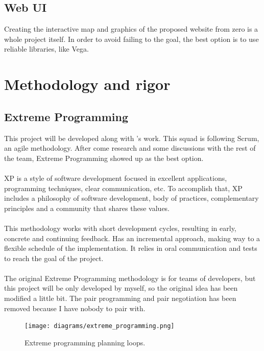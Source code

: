 \subsection{Web UI}

Creating the interactive map and graphics of the proposed website from zero is a whole project itself. In order to avoid failing to the  goal, the best option is to use reliable libraries, like Vega\cite{vega}.


\section{Methodology and rigor}

\subsection{Extreme Programming}

This project will be developed along with \squad's work. This squad is following Scrum, an agile methodology. After come research and some discussions with the rest of the team, Extreme Programming\cite{xp} showed up as the best option.
\\\\
XP is a style of software development focused in excellent applications, programming techniques, clear communication, etc. To accomplish that, XP includes a philosophy of software development, body of practices, complementary principles and a community that shares these values.
\\\\
This methodology works with short development cycles, resulting in early, concrete and continuing feedback. Has an incremental approach, making way to a flexible schedule of the implementation. It relies in oral communication and tests to reach the goal of the project.
\\\\
The original Extreme Programming methodology is for teams of developers, but this project will be only developed by myself, so the original idea has been modified a little bit. The pair programming and pair negotiation has been removed because I have nobody to pair with.

\begin{figure}[H]
\centering
\texttt{[image: diagrams/extreme\_programming.png]}
\caption{Extreme programming planning loops.}
\end{figure}

